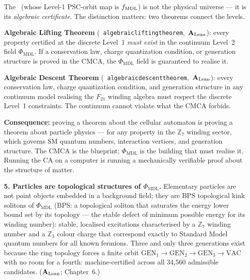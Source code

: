 \documentclass[11pt,openany]{book}
\theoremstyle{remark}
\newcommand{\PHIMDL}{\Phi_{\mathrm{MDL}}}
\newcommand{\lean}[1]{%
  \penalty-100
  \begingroup\def\_{\textunderscore\allowbreak}\texttt{#1}\endgroup}
\newcommand{\CMCA}{\text{CMCA}}
\newcommand{\CatAL}{\ensuremath{\textbf{A}_{\rm Lean}}}
\begin{document}
\begin{tcolorbox}[colback=blue!4,colframe=blue!50!black,
  title={\textbf{The Algebraic Certificate: Why CA Theorems Are Physics Theorems}},
  fonttitle=\small\bfseries, left=6pt, right=6pt, top=4pt, bottom=4pt]
\small
The \CMCA\ (whose Level-1 PSC-orbit map is $f_{\rm MDL}$) is not the
physical universe --- it is its \emph{algebraic certificate}.
The distinction matters: two theorems connect the levels.

\smallskip
\textbf{Algebraic Lifting Theorem} \mbox{(\lean{algebraic\_lifting\_theorem}, \CatAL)}:
every property certified at the discrete Level~1 \emph{must exist} in the continuum
Level~2 field $\PHIMDL$.
If a conservation law, charge quantization condition, or generation structure is proved
in the CMCA, the $\PHIMDL$ field is guaranteed to realise it.

\smallskip
\textbf{Algebraic Descent Theorem} \mbox{(\lean{algebraic\_descent\_theorem}, \CatAL)}:
every conservation law, charge quantization condition, and generation structure in
any continuum model realising the $F_{21}$ winding algebra must respect the discrete
Level~1 constraints.
The continuum cannot violate what the CMCA forbids.

\smallskip\noindent
\textbf{Consequence:} proving a theorem about the cellular automaton is proving a
theorem about particle physics --- for any property in the $\mathbb{Z}_7$ winding
sector, which governs SM quantum numbers, interaction vertices, and generation
structure.
The CMCA is the blueprint; $\PHIMDL$ is the building that must realise it.
Running the CA on a computer is running a mechanically verifiable proof
about the structure of matter.
\end{tcolorbox}

\medskip

\textbf{5. Particles are topological structures of $\PHIMDL$.}
Elementary particles are not point objects embedded in a background field;
they are BPS topological kink solitons of $\PHIMDL$
(BPS: a topological soliton that saturates the energy lower bound set by its topology ---
the stable defect of minimum possible energy for its winding number):
stable, localised excitations characterised by a $\mathbb{Z}_7$ winding number and a
$\mathbb{Z}_3$ colour charge that correspond exactly to Standard Model
quantum numbers for all known fermions.
Three and only three generations exist because the ring topology forces a
finite orbit $\mathrm{GEN}_1 \to \mathrm{GEN}_2 \to \mathrm{GEN}_3 \to
\mathrm{VAC}$ with no room for a fourth: machine-certified across all
34,560 admissible candidates.
(\CatAL; Chapter~6.)
\end{document}
